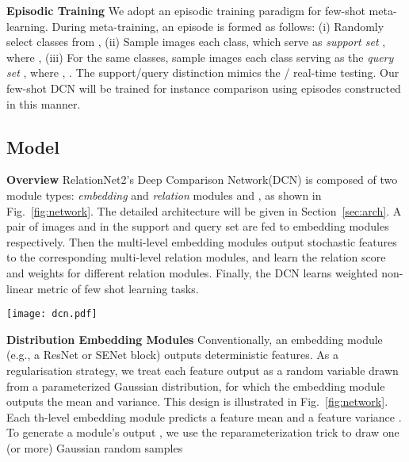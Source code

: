 \documentclass[conference]{IEEEtran}
\def\modelname{Deep Comparison Network\xspace}
\def\modelnameshort{DCN}
\def\modelnamefull{\modelname (\modelnameshort)\xspace}
\newcommand{\cut}[1]{}
\newcommand{\keypoint}[1]{\vspace{0.05cm}\noindent\textbf{#1}\quad}
\begin{document}
\keypoint{Episodic Training} 
We adopt an episodic training paradigm for few-shot meta-learning. During meta-training, an episode is formed as follows: (i) Randomly select  classes from , (ii) Sample  images each class, which serve as \emph{support set} , where , (iii) For the same  classes, sample  images each class serving as the \emph{query set} , where , . The support/query distinction mimics the  / real-time testing. Our few-shot \modelnameshort{}  will be trained for instance comparison using episodes constructed in this manner. 

\subsection{Model}
\label{sec:model}
\keypoint{Overview} RelationNet2's 
\modelnamefull is composed of two module types: \emph{embedding} and \emph{relation} modules  and , as shown in Fig.~\ref{fig:network}. The detailed architecture will be given in Section~\ref{sec:arch}. A pair of images  and  in the support and query set are fed to embedding modules respectively. Then the multi-level embedding modules output stochastic features to the corresponding multi-level relation modules, and learn the relation score and weights for different relation modules. Finally, the \modelnameshort{} learns weighted non-linear metric of few shot learning tasks.

\begin{figure*}[t]
\centering
\texttt{[image: dcn.pdf]}
\caption{\small RelationNet2's DCN architecture. There are 4 embedding modules  for each embedding branch, and a set of 4 corresponding relation modules . Support set and query set share the same embedding network. Each embedding module outputs a feature distribution , we then randomly sample a feature  as the input of corresponding relation module and next embedding module.\cut{ Embedding modules  and relation modules  are paramaterized by  and  respectively.}}
\label{fig:network}
\end{figure*}

\keypoint{Distribution Embedding Modules}
Conventionally, an embedding module (e.g., a ResNet or SENet block) outputs deterministic features. As a regularisation strategy, we treat each feature output as a random variable drawn from a parameterized Gaussian distribution, for which the embedding module outputs the mean and variance. This design is illustrated in Fig.~\ref{fig:network}. Each th-level embedding module predicts a feature mean  and a feature variance . To generate a module's output , we use the reparameterization trick to draw one (or more) Gaussian random samples 
\end{document}
